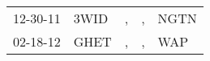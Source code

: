 \begin{supertabular}{lllll}
 12-30-11 &  3WID &  , &  , &  NGTN \\
 02-18-12 &  GHET &  , &  , &   WAP \\
\end{supertabular}
